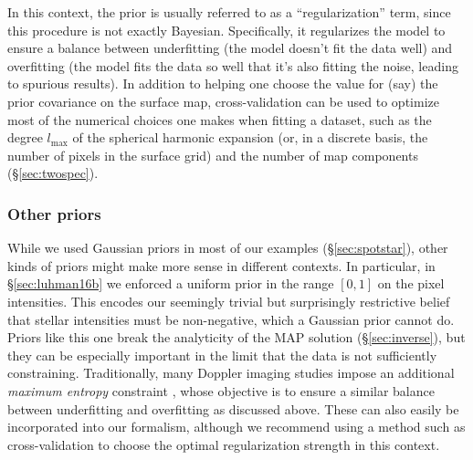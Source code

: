 \documentclass[modern]{aastex631}
\begin{document}
In this context, the prior is usually referred to as a ``regularization'' term, since this procedure is not exactly Bayesian. 
Specifically, it regularizes the model to ensure a balance between underfitting (the model doesn't fit the data well) and overfitting (the model fits the data so well that it's also fitting the noise, leading to spurious results).
In addition to helping one choose the value for (say) the prior covariance on the surface map, cross-validation can be used to optimize most of the numerical choices one makes when fitting a dataset, such as the degree $l_\mathrm{max}$ of the spherical harmonic expansion (or, in a discrete basis, the number of pixels in the surface grid) and the number of map components (\S\ref{sec:twospec}).

\subsubsection{Other priors}
\label{sec:discussion:priors:nongaussian}

While we used Gaussian priors in most of our examples (\S\ref{sec:spotstar}), other kinds of priors might make more sense in different contexts. 
In particular, in \S\ref{sec:luhman16b} we enforced a uniform prior in the range $[0, 1]$ on the pixel intensities. 
This encodes our seemingly trivial but surprisingly restrictive \citep[see][]{Fienup1982} belief that stellar intensities must be non-negative, which a Gaussian prior cannot do.
Priors like this one break the analyticity of the MAP solution (\S\ref{sec:inverse}), but they can be especially important in the limit that the data is not sufficiently constraining.
Traditionally, many Doppler imaging studies impose an additional \emph{maximum entropy} constraint \citep{Vogt1987}, whose objective is to ensure a similar balance between underfitting and overfitting as discussed above.
These can also easily be incorporated into our formalism, although we recommend using a method such as cross-validation to choose the optimal regularization strength in this context.
\end{document}
